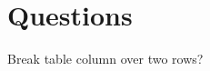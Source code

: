 
\newpage
\section{Questions}
\begin{itemize*}
     \item{} Break table column over two rows?
\end{itemize*}


